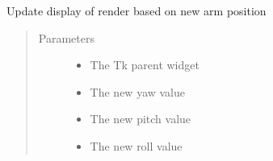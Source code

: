 \documentclass[letterpaper,10pt,english,openany,oneside]{sphinxmanual}
\begin{document}
\begin{fulllineitems}
\begin{fulllineitems}
\label{\detokenize{src/positionframe:PositionFrame.RenderDiagram.update_render}}
Update display of render based on new arm position
\begin{quote}\begin{description}
\item[{Parameters}] \leavevmode\begin{itemize}
\item {} 
 \textendash{} The Tk parent widget

\item {} 
 \textendash{} The new yaw value

\item {} 
 \textendash{} The new pitch value

\item {} 
 \textendash{} The new roll value

\end{itemize}

\end{description}\end{quote}

\end{fulllineitems}


\end{fulllineitems}

\end{document}
